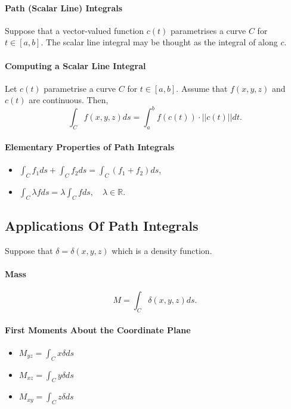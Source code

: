 \documentclass[12pt, letterpaper]{article}
\begin{document}
    \paragraph{Path (Scalar Line) Integrals}
    Suppose that a vector-valued function \(c(t)\) parametrises a 
    curve \(C\) for \(t\in [a, b]\).
    The scalar line integral may be thought as the integral of along \(c\).

    \paragraph{Computing a Scalar Line Integral}
    Let \(c(t)\) parametrise a curve \(C\) for \(t\in [a, b]\).
    Assume that \(f(x, y, z)\) and \(c(t)\) are continuous.
    Then,
    \[
        \int_{C} f(x, y, z) ds
        =
        \int_{a}^{b} f\left(c\left(t\right)\right) \cdot ||c(t)|| dt.
    \]

    \paragraph{Elementary Properties of Path Integrals}
    \begin{itemize}
        \item \(\int_C f_1 ds + \int_C f_2 ds = \int_C(f_1+f_2)ds\),
        \item \(\int_C\lambda f ds = \lambda \int_C f ds, \quad
        \lambda\in \mathbb{R}\).
    \end{itemize}
    
    \subsection{Applications Of Path Integrals}
    Suppose that \(\delta = \delta(x, y, z)\) which is a density function.

    \paragraph{Mass}
    \[M = \int_C \delta(x, y, z) ds.\]

    \paragraph{First Moments About the Coordinate Plane}
    \begin{itemize}
        \item \(M_{yz} = \int_C x \delta ds\)
        \item \(M_{xz} = \int_C y \delta ds\)
        \item \(M_{xy} = \int_C z \delta ds\)
    \end{itemize}
    
\end{document}
